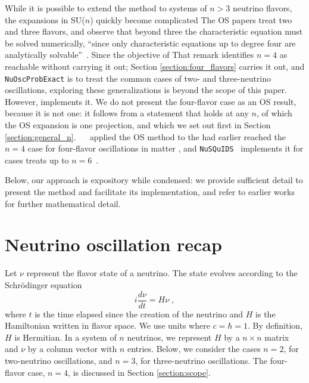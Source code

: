 \documentclass[final,5p,times,twocolumn]{elsarticle}
\providecommand{\Ref}{} %
\providecommand{\DIFaddtex}[1]{{\protect\color{blue} \sf #1}} %
\providecommand{\DIFdeltex}[1]{{\protect\color{red} \scriptsize #1}} %
\providecommand{\DIFaddbegin}{} %
\providecommand{\DIFaddend}{} %
\providecommand{\DIFdelbegin}{} %
\providecommand{\DIFdelend}{} %
\providecommand{\DIFadd}[1]{\DIFaddtex{#1}} %
\providecommand{\DIFdel}[1]{\DIFdeltex{#1}} %
\begin{document}
\DIFdelbegin \DIFdel{While it is possible to extend the method to systems of $n > 3$ neutrino flavors, the expansions in SU($n$) quickly become complicated}\DIFdelend \DIFaddbegin \DIFadd{The OS papers treat two and three flavors, and observe that beyond three the characteristic equation must be solved numerically, ``since only characteristic equations up to degree four are analytically solvable''}\DIFaddend \ \cite{Kusnezov:1995, VanKortryk:2015kua}.  \DIFdelbegin \DIFdel{Since the objective of }\DIFdelend \DIFaddbegin \DIFadd{That remark identifies $n=4$ as reachable without carrying it out; Section \ref{section:four_flavors} carries it out, and }\DIFaddend {\tt NuOscProbExact} \DIFdelbegin \DIFdel{is to treat the common cases of two- and three-neutrino oscillations, exploring these generalizations is beyond the scope of this paper.  However, }\DIFdelend \DIFaddbegin \DIFadd{implements it.  We do not present the four-flavor case as an OS result, because it is not one: it follows from a statement that holds at any $n$, of which the OS expansion is one projection, and which we set out first in Section \ref{section:general_n}.  \ }\DIFaddend \Ref\ \cite{Kamo:2002sj} \DIFdelbegin \DIFdel{applied the OS method to the }\DIFdelend \DIFaddbegin \DIFadd{had earlier reached the }\DIFaddend $n=4$ case for four-flavor oscillations in matter\DIFaddbegin \DIFadd{, }\DIFaddend and {\tt NuSQuIDS}\ \cite{Delgado:2014kpa, NuSQuIDS} \DIFdelbegin \DIFdel{implements it for cases }\DIFdelend \DIFaddbegin \DIFadd{treats }\DIFaddend up to $n=6$\ \cite{Salvado:Private}.

Below, our approach is expository while condensed: we provide sufficient detail to present the method and facilitate its implementation, and refer to earlier works for further mathematical detail.




\section{Neutrino oscillation recap}
\label{section:general_remarks}

Let $\nu$ represent the flavor state of a neutrino.  The state evolves according to the Schr\"odinger equation
\begin{equation}
 \label{equ:evolution_eq}
 i \frac{d\nu}{dt} = H \nu \;,
\end{equation}
where $t$ is the time elapsed since the creation of the neutrino and $H$ is the Hamiltonian written in flavor space.  We use units where $c = \hbar = 1$.  By definition, $H$ is Hermitian.  In a system of $n$ neutrinos, we represent $H$ by a $n \times n$ matrix and $\nu$ by a column vector with $n$ entries.  Below, we consider the cases $n=2$, for two-neutrino oscillations, and $n=3$, for three-neutrino oscillations.  \DIFaddbegin \DIFadd{The four-flavor case, $n=4$, is discussed in Section \ref{section:scope}.
}\DIFaddend 
\end{document}

